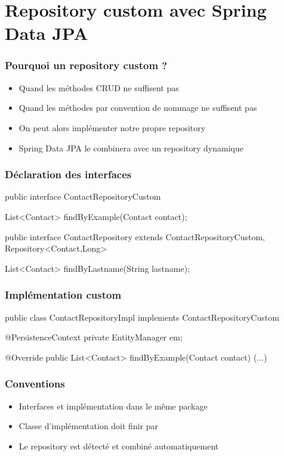 \section{Repository custom avec Spring Data JPA}



\begin{frame}
 \frametitle{Pourquoi un repository custom ?}
 \begin{itemize}
  \item Quand les méthodes CRUD ne suffisent pas
  \item Quand les méthodes par convention de nommage ne suffisent pas
  \item On peut alors implémenter notre propre repository
  \item Spring Data JPA le combinera avec un repository dynamique
 \end{itemize}
\end{frame}

\begin{frame}[fragile]
 \frametitle{Déclaration des interfaces}
 \begin{javacode}
public interface ContactRepositoryCustom {

  List<Contact> findByExample(Contact contact);

}

public interface ContactRepository extends ContactRepositoryCustom, 
                                           Repository<Contact,Long> {

  List<Contact> findByLastname(String lastname);

}
 \end{javacode}
\end{frame}

\begin{frame}[fragile]
 \frametitle{Implémentation custom}
 \begin{javacode}
public class ContactRepositoryImpl implements ContactRepositoryCustom {

  @PersistenceContext private EntityManager em;

  @Override
  public List<Contact> findByExample(Contact contact) {
    (...)
  }

}
 \end{javacode}
\end{frame}

\begin{frame}
 \frametitle{Conventions}
 \begin{itemize}
  \item Interfaces et implémentation dans le même package
  \item Classe d'implémentation doit finir par 
  \item Le repository est détecté et combiné automatiquement
 \end{itemize}
\end{frame}

